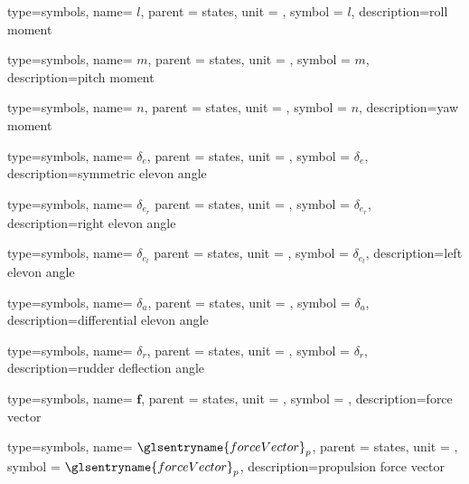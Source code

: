 {type=symbols,
    name= \ensuremath{l},
    parent = {states},
    unit = \unexpanded{\si{\newton\meter}},
    symbol = \ensuremath{l},
    description={roll moment}
}

{type=symbols,
    name= \ensuremath{m},
    parent = {states},
    unit = \unexpanded{\si{\newton\meter}},
    symbol = \ensuremath{m},
    description={pitch moment}
}

{type=symbols,
    name= \ensuremath{n},
    parent = {states},
    unit = \unexpanded{\si{\newton\meter}},
    symbol = \ensuremath{n},
    description={yaw moment}
}

{type=symbols,
    name= \ensuremath{\delta_{e}},
    parent = {states},
    unit = \unexpanded{\si{\radian}},
    symbol = \ensuremath{\delta_{e}},
    description={symmetric elevon angle}
}

{type=symbols,
name= \ensuremath{\delta_{e_{r}}}
parent = {states},
unit = \unexpanded{\si{\radian}},
symbol = \ensuremath{\delta_{e_{r}}},
description={right elevon angle}
}


{type=symbols,
name= \ensuremath{\delta_{e_{l}}}
parent = {states},
unit = \unexpanded{\si{\radian}},
symbol = \ensuremath{\delta_{e_{l}}},
description={left elevon angle}
}



{type=symbols,
    name= \ensuremath{\delta_{a}},
    parent = {states},
    unit = \unexpanded{\si{\degree}},
    symbol = \ensuremath{\delta_{a}},
    description={differential elevon angle}
}

{type=symbols,
    name= \ensuremath{\delta_{r}},
    parent = {states},
    unit = \unexpanded{\si{\degree}},
    symbol = \ensuremath{\delta_{r}},
    description={rudder deflection angle}
}

{type=symbols,
    name= \ensuremath{\mathbf{f}},
    parent = {states},
    unit = \unexpanded{\si{\newton}},
    symbol = ,
    description={force vector}
}

{type=symbols,
    name= \ensuremath{{\glsentryname{forceVector}}_{p}},
    parent = {states},
    unit = \unexpanded{\si{\newton}},
    symbol = \ensuremath{{\glsentryname{forceVector}}_{p}},
    description={propulsion force vector}
}

